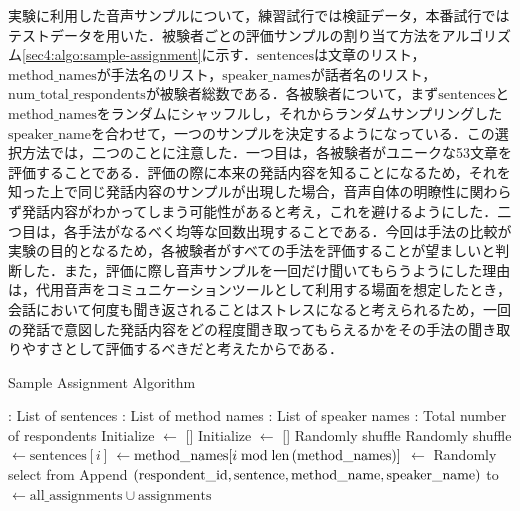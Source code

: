\documentclass[12pt]{jarticle}
\numberwithin{equation}{section}    %
\numberwithin{figure}{section}      %
\numberwithin{table}{section}      %
\begin{document}
実験に利用した音声サンプルについて，練習試行では検証データ，本番試行ではテストデータを用いた．被験者ごとの評価サンプルの割り当て方法をアルゴリズム\ref{sec4:algo:sample-assignment}に示す．$\text{sentences}$は文章のリスト，$\text{method\_names}$が手法名のリスト，$\text{speaker\_names}$が話者名のリスト，$\text{num\_total\_respondents}$が被験者総数である．各被験者について，まず$\text{sentences}$と$\text{method\_names}$をランダムにシャッフルし，それからランダムサンプリングした$\text{speaker\_name}$を合わせて，一つのサンプルを決定するようになっている．この選択方法では，二つのことに注意した．一つ目は，各被験者がユニークな53文章を評価することである．評価の際に本来の発話内容を知ることになるため，それを知った上で同じ発話内容のサンプルが出現した場合，音声自体の明瞭性に関わらず発話内容がわかってしまう可能性があると考え，これを避けるようにした．二つ目は，各手法がなるべく均等な回数出現することである．今回は手法の比較が実験の目的となるため，各被験者がすべての手法を評価することが望ましいと判断した．また，評価に際し音声サンプルを一回だけ聞いてもらうようにした理由は，代用音声をコミュニケーションツールとして利用する場面を想定したとき，会話において何度も聞き返されることはストレスになると考えられるため，一回の発話で意図した発話内容をどの程度聞き取ってもらえるかをその手法の聞き取りやすさとして評価するべきだと考えたからである．
\begin{algorithm}
    \caption{Sample Assignment Algorithm}
    \label{sec4:algo:sample-assignment}
    \begin{algorithmic}[1]
        \Require {}: List of sentences
        \Require {}: List of method names
        \Require {}: List of speaker names
        \Require {}: Total number of respondents
        \State Initialize  $\gets$ []
        \State Initialize  $\gets$ []
        \State Randomly shuffle 
        \State Randomly shuffle 
        \State {} $\gets \text{sentences}[i]$
        \State {} $\gets \text{method\_names}[i \bmod \text{len}\left(\text{method\_names}\right)]$
        \State {} $\gets$ Randomly select from 
        \State Append $\left(\text{respondent\_id}, \text{sentence}, \text{method\_name}, \text{speaker\_name}\right)$ to 
        \EndFor
        \State {} $\gets \text{all\_assignments} \cup \text{assignments}$
        \EndFor
        \State \Return {}
    \end{algorithmic}
\end{algorithm}
\end{document}
